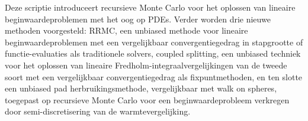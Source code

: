 Deze scriptie introduceert recursieve Monte Carlo voor het oplossen van
lineaire beginwaardeproblemen met het oog op PDEs.
Verder worden drie nieuwe methoden voorgesteld: RRMC, een unbiased methode
voor lineaire beginwaardeproblemen met een vergelijkbaar convergentiegedrag in
stapgrootte of functie-evaluaties als traditionele solvers, coupled splitting, een unbiased techniek
voor het oplossen van lineaire Fredholm-integraalvergelijkingen van de tweede soort met een vergelijkbaar
convergentiegedrag als fixpuntmethoden, en ten slotte een unbiased pad herbruikingsmethode,
vergelijkbaar met walk on spheres,
toegepast op recursieve Monte Carlo voor een
beginwaardeprobleem verkregen door semi-discretisering van de warmtevergelijking.